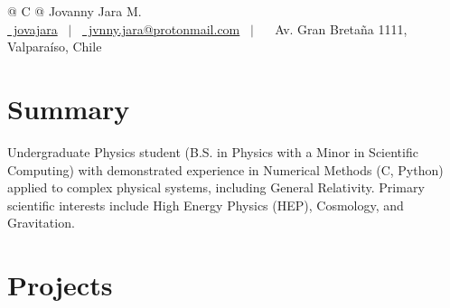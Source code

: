 \documentclass[a4paper,12pt]{article}
\begin{document}
\pagestyle{empty} 



\begin{tabularx}{\linewidth}{@{} C @{}}
\Huge{Jovanny Jara M.} \\[7.5pt]
\href{https://github.com/jovajara}{\raisebox{-0.05\height}\faGithub\ jovajara} \ $|$ \ 
\href{mailto:jvnny.jara@protonmail.com}{\raisebox{-0.05\height}\faEnvelope \ jvnny.jara@protonmail.com} \ $|$ \ {\raisebox{-0.05\height} \faMapMarked \ Av. Gran Bretaña 1111, Valparaíso, Chile} \
 \\
\end{tabularx}


\section{Summary}
Undergraduate Physics student (B.S. in Physics with a Minor in Scientific Computing) with demonstrated experience in Numerical Methods (C, Python) applied to complex physical systems, including General Relativity. Primary scientific interests include High Energy Physics (HEP), Cosmology, and Gravitation.
  
\section{Projects}
\end{document}
